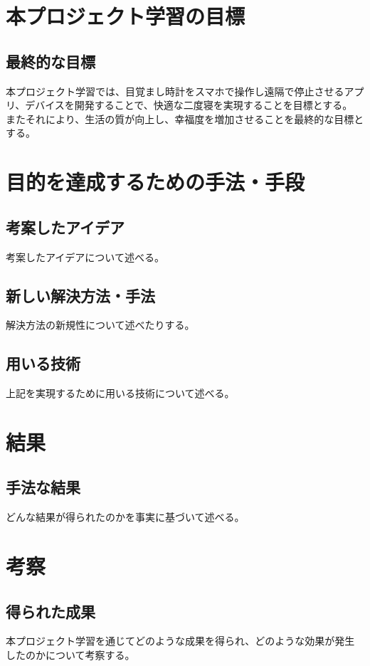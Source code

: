 \chapter{本プロジェクト学習の目標}
\section{最終的な目標}
本プロジェクト学習では、目覚まし時計をスマホで操作し遠隔で停止させるアプリ、デバイスを開発することで、快適な二度寝を実現することを目標とする。
またそれにより、生活の質が向上し、幸福度を増加させることを最終的な目標とする。

\chapter{目的を達成するための手法・手段}
\section{考案したアイデア}
考案したアイデアについて述べる。

\section{新しい解決方法・手法}
解決方法の新規性について述べたりする。

\section{用いる技術}
上記を実現するために用いる技術について述べる。

\chapter{結果}
\section{手法な結果}
どんな結果が得られたのかを事実に基づいて述べる。

\chapter{考察}
\section{得られた成果}
本プロジェクト学習を通じてどのような成果を得られ、どのような効果が発生したのかについて考察する。

